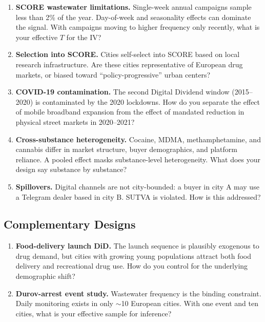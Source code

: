 \documentclass[11pt,a4paper]{article}
\begin{document}
\begin{enumerate}
\item \textbf{SCORE wastewater limitations.} Single-week annual campaigns sample less than 2\% of the year. Day-of-week and seasonality effects can dominate the signal. With campaigns moving to higher frequency only recently, what is your effective $T$ for the IV?

\item \textbf{Selection into SCORE.} Cities self-select into SCORE based on local research infrastructure. Are these cities representative of European drug markets, or biased toward ``policy-progressive'' urban centers?

\item \textbf{COVID-19 contamination.} The second Digital Dividend window (2015--2020) is contaminated by the 2020 lockdowns. How do you separate the effect of mobile broadband expansion from the effect of mandated reduction in physical street markets in 2020--2021?

\item \textbf{Cross-substance heterogeneity.} Cocaine, MDMA, methamphetamine, and cannabis differ in market structure, buyer demographics, and platform reliance. A pooled effect masks substance-level heterogeneity. What does your design say substance by substance?

\item \textbf{Spillovers.} Digital channels are not city-bounded: a buyer in city A may use a Telegram dealer based in city B. SUTVA is violated. How is this addressed?
\end{enumerate}

\subsection{Complementary Designs}

\begin{enumerate}
\item \textbf{Food-delivery launch DiD.} The launch sequence is plausibly exogenous to drug demand, but cities with growing young populations attract both food delivery and recreational drug use. How do you control for the underlying demographic shift?

\item \textbf{Durov-arrest event study.} Wastewater frequency is the binding constraint. Daily monitoring exists in only $\sim$10 European cities. With one event and ten cities, what is your effective sample for inference?
\end{enumerate}
\end{document}
